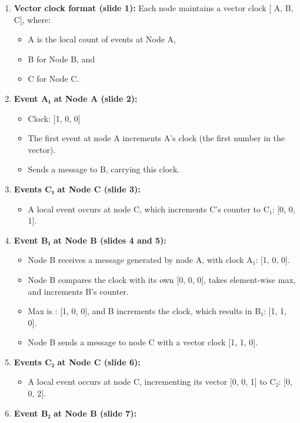\begin{enumerate}
\def\labelenumi{\arabic{enumi}.}
\tightlist
\item
\textbf{Vector clock format (slide 1):} Each node maintains a vector clock {[} A, B, C{]}, where:

\begin{itemize}
\tightlist
\item
A is the local count of events at Node A,
\item
B for Node B, and
\item
C for Node C.
\end{itemize}
\item
\textbf{Event A₁ at Node A (slide 2):}

\begin{itemize}
\tightlist
\item
Clock: {[}1, 0, 0{]}
\item
The first event at node A increments A's clock (the first number in the vector).
\item
Sends a message to B, carrying this clock.
\end{itemize}
\item
\textbf{Events C₁ at Node C (slide 3):}

\begin{itemize}
\tightlist
\item
A local event occurs at node C, which increments C's counter to C₁: {[}0, 0, 1{]}.
\end{itemize}
\item
\textbf{Event B₁ at Node B (slides 4 and 5):}

\begin{itemize}
\item
Node B receives a message generated by node A, with clock A₁: {[}1, 0, 0{]}.
\item
Node B compares the clock with its own {[}0, 0, 0{]}, takes element-wise max, and increments B's counter.
\item
Max is : {[}1, 0, 0{]}, and B increments the clock, which results in B₁: {[}1, 1, 0{]}.
\item
Node B sends a message to node C with a vector clock {[}1, 1, 0{]}.
\end{itemize}
\item
\textbf{Events C₂ at Node C (slide 6):}

\begin{itemize}
\tightlist
\item
A local event occurs at node C, incrementing its vector {[}0, 0, 1{]} to C₂: {[}0, 0, 2{]}.
\end{itemize}
\item
\textbf{Event B₂ at Node B (slide 7):}


\end{enumerate}
